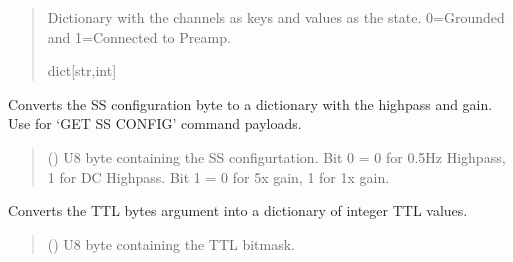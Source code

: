 \documentclass[letterpaper,10pt,english]{sphinxmanual}
\begin{document}
\begin{fulllineitems}
\begin{fulllineitems}
\begin{quote}
\begin{description}
\sphinxAtStartPar
Dictionary with the channels as keys and values as the state.                 0=Grounded and 1=Connected to Preamp.

\sphinxAtStartPar
dict{[}str,int{]}

\end{description}\end{quote}

\end{fulllineitems}


\begin{fulllineitems}
\label{\detokenize{PodDevice_8401HR:PodDevice_8401HR.POD_8401HR.DecodeSSConfigBitmask}}
\pysigstartsignatures
{}
\pysigstopsignatures
\sphinxAtStartPar
Converts the SS configuration byte to a dictionary with the high\sphinxhyphen{}pass and gain.         Use for ‘GET SS CONFIG’ command payloads.
\begin{quote}\begin{description}
\sphinxAtStartPar
{} () \textendash{} U8 byte containing the SS configurtation. Bit 0 = 0 for 0.5Hz Highpass,                 1 for DC Highpass. Bit 1 = 0 for 5x gain, 1 for 1x gain.

\end{description}\end{quote}

\end{fulllineitems}


\begin{fulllineitems}
\label{\detokenize{PodDevice_8401HR:PodDevice_8401HR.POD_8401HR.DecodeTTLByte}}
\pysigstartsignatures
{}
\pysigstopsignatures
\sphinxAtStartPar
Converts the TTL bytes argument into a dictionary of integer TTL values.
\begin{quote}\begin{description}
\sphinxAtStartPar
{} () \textendash{} U8 byte containing the TTL bitmask.


\end{description}
\end{quote}
\end{fulllineitems}
\end{fulllineitems}
\end{document}
